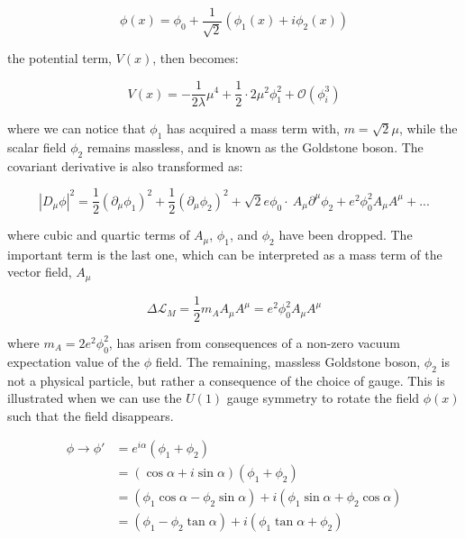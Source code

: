\begin{equation}\label{eq:abelian_higgs_mechanism_expanded_phi}
\phi(x) = \phi_{0} + \frac{1}{\sqrt{2}}(\phi_{1}(x) + i\phi_{2}(x))
\end{equation}

\noindent the potential term, $V(x)$, then becomes:

\begin{equation}\label{eq:abelian_higgs_mechanism_expanded_pot}
V(x) = -\frac{1}{2\lambda}\mu^{4} +
\frac{1}{2}\cdot2\mu^{2}\phi_{1}^{2} + \mathcal{O}(\phi_{i}^{3})
\end{equation}

\noindent where we can notice that $\phi_{1}$ has acquired a mass term
with, $m = \sqrt{2}\mu$, while the scalar field $\phi_{2}$ remains
massless, and is known as the Goldstone boson.  The covariant
derivative is also transformed as:

\begin{equation}\label{eq:abelian_higgs_mechanism_expanded_covDer}
|D_{\mu}\phi|^{2} = \frac{1}{2}(\partial_{\mu}\phi_{1})^{2} +
\frac{1}{2}(\partial_{\mu}\phi_{2})^{2} +
\sqrt{2}e\phi_{0}\cdot~A_{\mu}\partial^{\mu}\phi_{2} +
e^{2}\phi_{0}^{2}A_{\mu}A^{\mu} + ...
\end{equation}

\noindent where cubic and quartic terms of $A_{\mu}$, $\phi_{1}$,
and $\phi_{2}$ have been dropped.  The important term is the last one,
which can be interpreted as a mass term of the vector field, $A_{\mu}$

\begin{equation}\label{eq:abelian_higgs_mechanism_mass_term_Amu}
\Delta\mathcal{L}_{M} =
  \frac{1}{2}m_{A}A_{\mu}A^{\mu} = e^{2}\phi_{0}^{2}A_{\mu}A^{\mu}
\end{equation}

\noindent where $m_{A} = 2e^{2}\phi_{0}^{2}$, has arisen from
consequences of a non-zero vacuum expectation value of the $\phi$
field.  The remaining, massless Goldstone boson, $\phi_{2}$ is not a
physical particle, but rather a consequence of the choice of gauge.
This is illustrated when we can use the $U(1)$ gauge symmetry to rotate
the field $\phi(x)$ such that the field disappears.  

\begin{equation}\label{eq:abelian_higgs_mechanism_rotate_phi2}
\begin{aligned}
 \phi \rightarrow \phi' & = e^{i\alpha}(\phi_{1} + \phi_{2}) \\
& = (\cos{\alpha} + i\sin{\alpha})(\phi_{1} + \phi_{2}) \\
& = (\phi_{1}\cos{\alpha} - \phi_{2}\sin{\alpha}) +
i(\phi_{1}\sin{\alpha} + \phi_{2}\cos{\alpha}) \\
& = (\phi_{1} - \phi_{2}\tan{\alpha}) + i(\phi_{1}\tan{\alpha} +
\phi_{2})
\end{aligned}
\end{equation}

